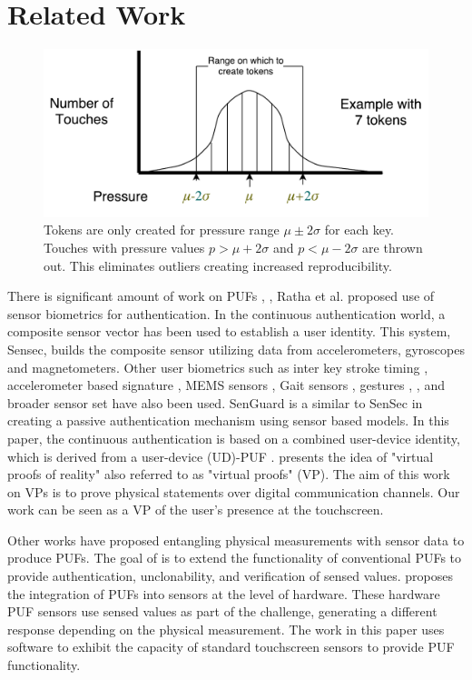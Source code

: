 \documentclass{acm_proc_article-sp}
\begin{document}
\section{Related Work}
\label{sec:related_work}

\begin{figure}
\centering
\includegraphics[width=.45\textwidth, keepaspectratio]{token_creation.pdf}
\caption{
Tokens are only created for 
pressure range $\mu \pm 2\sigma$ 
for each key.
Touches with pressure values
$p>\mu + 2\sigma$ and $p<\mu - 2\sigma$
are thrown out.
This eliminates outliers creating
increased reproducibility.
}
\label{fig:token_creation}
\end{figure}

There is significant amount of work on PUFs \cite{Devadas:2009:PUF}, \cite{PUFIntro}, \cite{Gassend:2002:SPR}
Ratha et al. \cite{Ratha:2001} proposed use of sensor biometrics for authentication.
%
In the continuous authentication world, a composite sensor vector \cite{zhu2013sensec} has been used to establish a user identity. 
This system, Sensec, builds the composite sensor
utilizing data from accelerometers, gyroscopes and magnetometers.
%
Other user biometrics such as inter key stroke timing 
\cite{KeystrokeHASE14},  accelerometer based signature \cite{Liu:2009:UAP}, MEMS sensors
\cite{Aysu:2013:DFL}, Gait sensors \cite{Gait}, gestures \cite{touchscreengestures}, \cite{Gesture14}, and 
broader sensor set \cite{Dey:2013:AHP} have also been
used. 
SenGuard \cite{shi2011senguard} is a similar to SenSec in creating a passive
authentication mechanism using sensor based models. In this paper, the continuous authentication is based on a combined user-device identity,
which is derived from a user-device (UD)-PUF \cite{ScheelTyagi15}.
%
\cite{ruhrmair2015virtual} presents the idea of
"virtual proofs of reality" 
also referred to as "virtual proofs" (VP).
The aim of this work on VPs is
to prove physical statements over digital communication channels.
%
Our work can be seen as
a VP of the user's presence at the touchscreen.

Other works \cite{rosenfeld2010sensor} have proposed 
entangling physical measurements with sensor data
to produce PUFs.
%
The goal of \cite{rosenfeld2010sensor} is to 
extend the functionality of conventional PUFs
to provide authentication, unclonability, and verification of sensed values.
\cite{rosenfeld2010sensor} proposes the integration of PUFs into sensors
at the level of hardware.
These hardware PUF sensors use sensed values as part of the challenge,
generating a different response depending on the physical measurement.
%
The work in this paper uses software to exhibit
the capacity of standard touchscreen sensors to provide PUF functionality.
\end{document}
